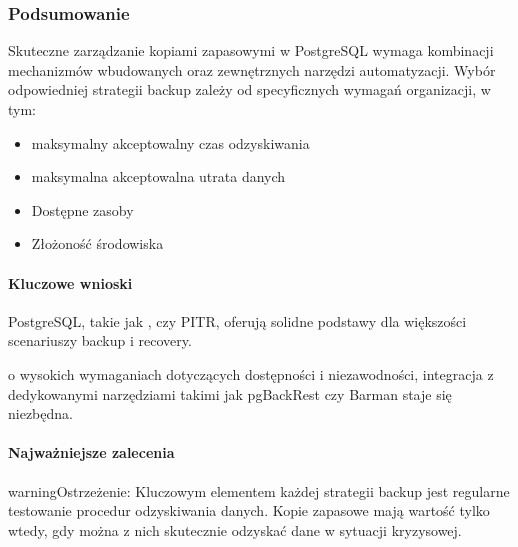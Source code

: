 \documentclass[letterpaper,10pt,polish]{sphinxmanual}
\begin{document}
\subsubsection{Podsumowanie}
\label{\detokenize{rozdzial2/Kopie_zapasowe_i_odzyskiwanie_danych/kopie_zapasowe_i_odzyskiwanie_danych:podsumowanie}}
\sphinxAtStartPar
Skuteczne zarządzanie kopiami zapasowymi w PostgreSQL wymaga kombinacji mechanizmów wbudowanych oraz zewnętrznych narzędzi automatyzacji. Wybór odpowiedniej strategii backup zależy od specyficznych wymagań organizacji, w tym:
\begin{itemize}
\item {} 
\sphinxAtStartPar
{} \sphinxhyphen{} maksymalny akceptowalny czas odzyskiwania

\item {} 
\sphinxAtStartPar
{} \sphinxhyphen{} maksymalna akceptowalna utrata danych

\item {} 
\sphinxAtStartPar
Dostępne zasoby

\item {} 
\sphinxAtStartPar
Złożoność środowiska

\end{itemize}


\paragraph{Kluczowe wnioski}
\label{\detokenize{rozdzial2/Kopie_zapasowe_i_odzyskiwanie_danych/kopie_zapasowe_i_odzyskiwanie_danych:kluczowe-wnioski}}
\sphinxAtStartPar
{} PostgreSQL, takie jak ,  czy PITR, oferują solidne podstawy dla większości scenariuszy backup i recovery.

\sphinxAtStartPar
{} o wysokich wymaganiach dotyczących dostępności i niezawodności, integracja z dedykowanymi narzędziami takimi jak pgBackRest czy Barman staje się niezbędna.


\paragraph{Najważniejsze zalecenia}
\label{\detokenize{rozdzial2/Kopie_zapasowe_i_odzyskiwanie_danych/kopie_zapasowe_i_odzyskiwanie_danych:najwazniejsze-zalecenia}}
\begin{sphinxadmonition}{warning}{Ostrzeżenie:}
\sphinxAtStartPar
Kluczowym elementem każdej strategii backup jest regularne testowanie procedur odzyskiwania danych. Kopie zapasowe mają wartość tylko wtedy, gdy można z nich skutecznie odzyskać dane w sytuacji kryzysowej.
\end{sphinxadmonition}
\end{document}

